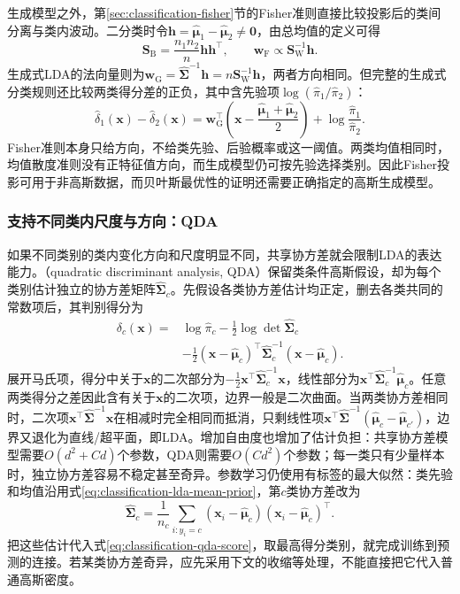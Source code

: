 生成模型之外，第\ref{sec:classification-fisher}节的Fisher准则直接比较投影后的类间分离与类内波动。二分类时令$\bm{h}=\hat{\bm{\mu}}_1-\hat{\bm{\mu}}_2\ne\bm{0}$，由总均值的定义可得
\[
  \bm{S}_{\mathrm{B}}=\frac{n_1n_2}{n}\bm{h}\bm{h}^{\top},
  \qquad
  \bm{w}_{\mathrm{F}}\propto\bm{S}_{\mathrm{W}}^{-1}\bm{h}.
\]
生成式LDA的法向量则为$\bm{w}_{\mathrm{G}}=\hat{\bm{\Sigma}}^{-1}\bm{h}=n\bm{S}_{\mathrm{W}}^{-1}\bm{h}$，两者方向相同。但完整的生成式分类规则还比较两类得分差的正负，其中含先验项$\log(\hat\pi_1/\hat\pi_2)$：
\begin{equation}
  \label{eq:classification-lda-binary-threshold}
  \hat\delta_1(\bm{x})-\hat\delta_2(\bm{x})
    =\bm{w}_{\mathrm{G}}^{\top}
      \left(\bm{x}-\frac{\hat{\bm{\mu}}_1+\hat{\bm{\mu}}_2}{2}\right)
      +\log\frac{\hat\pi_1}{\hat\pi_2}.
\end{equation}
Fisher准则本身只给方向，不给类先验、后验概率或这一阈值。两类均值相同时，均值散度准则没有正特征值方向，而生成模型仍可按先验选择类别。因此Fisher投影可用于非高斯数据，而贝叶斯最优性的证明还需要正确指定的高斯生成模型。

\subsubsection{支持不同类内尺度与方向：QDA}
\label{sec:classification-lda-covariance-extensions}

如果不同类别的类内变化方向和尺度明显不同，共享协方差就会限制LDA的表达能力。（quadratic discriminant analysis, QDA）保留类条件高斯假设，却为每个类别估计独立的协方差矩阵$\hat{\bm{\Sigma}}_c$。先假设各类协方差估计均正定，删去各类共同的常数项后，其判别得分为
\begin{equation}
  \begin{aligned}
    \delta_c(\bm{x})
      ={}&\log\hat{\pi}_c-\frac12\log\det\hat{\bm{\Sigma}}_c\\
        &-\frac12(\bm{x}-\hat{\bm{\mu}}_c)^\top
          \hat{\bm{\Sigma}}_c^{-1}(\bm{x}-\hat{\bm{\mu}}_c).
  \end{aligned}
  \label{eq:classification-qda-score}
\end{equation}
展开马氏项，得分中关于$\bm{x}$的二次部分为$-\tfrac12\bm{x}^{\top}\hat{\bm{\Sigma}}_c^{-1}\bm{x}$，线性部分为$\bm{x}^{\top}\hat{\bm{\Sigma}}_c^{-1}\hat{\bm{\mu}}_c$。任意两类得分之差因此含有关于$\bm{x}$的二次项，边界一般是二次曲面。当两类协方差相同时，二次项$\bm{x}^{\top}\hat{\bm{\Sigma}}^{-1}\bm{x}$在相减时完全相同而抵消，只剩线性项$\bm{x}^{\top}\hat{\bm{\Sigma}}^{-1}(\hat{\bm{\mu}}_c-\hat{\bm{\mu}}_{c'})$，边界又退化为直线/超平面，即LDA。增加自由度也增加了估计负担：共享协方差模型需要$O(d^2+Cd)$个参数，QDA则需要$O(Cd^2)$个参数；每一类只有少量样本时，独立协方差容易不稳定甚至奇异。参数学习仍使用有标签的最大似然：类先验和均值沿用式\eqref{eq:classification-lda-mean-prior}，第$c$类协方差改为
\[
  \hat{\bm\Sigma}_c=\frac1{n_c}\sum_{i:y_i=c}
    (\bm x_i-\hat{\bm\mu}_c)(\bm x_i-\hat{\bm\mu}_c)^\top.
\]
把这些估计代入式\eqref{eq:classification-qda-score}，取最高得分类别，就完成训练到预测的连接。若某类协方差奇异，应先采用下文的收缩等处理，不能直接把它代入普通高斯密度。

